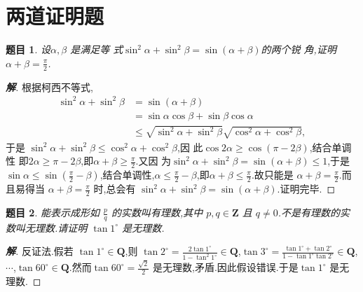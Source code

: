\documentclass[a4paper]{article}
\newtheorem*{hypo}{题目}
\begin{document}
\section{两道证明题}
\begin{hypo}
  设$\alpha,\beta$ 是满足等
  式$\sin^{2}\alpha+\sin^{2}\beta=\sin(\alpha+\beta)$的两个锐
  角,证明 $\alpha+\beta=\frac{\pi}{2}$.
\end{hypo}
\begin{proof}[\textbf{解}]
  根据柯西不等式,
\begin{align*}\sin^{2}\alpha+\sin^{2}\beta&=\sin(\alpha+\beta)\\&=\sin\alpha\cos\beta+\sin\beta\cos\alpha\\&\leq
  \sqrt{\sin^{2}\alpha+\sin^2\beta}\sqrt{\cos^{2}\alpha+\cos^{2}\beta},\end{align*}
于是 $\sin^{2}\alpha+\sin^{2}\beta\leq \cos^{2}\alpha+\cos^{2}\beta$,因
此$\cos2\alpha\geq \cos(\pi -2\beta)$,结合单调性
即$2\alpha\geq\pi-2\beta$,即$\alpha+\beta\geq \frac{\pi}{2}$.又因
为$\sin^{2}\alpha+\sin^{2}\beta=\sin(\alpha+\beta)\leq 1$,于是
$\sin\alpha\leq \sin(\frac{\pi}{2}-\beta)$,结合单调性,$\alpha\leq
\frac{\pi}{2}-\beta$,即$\alpha+\beta\leq \frac{\pi}{2}$.故只能是
$\alpha+\beta=\frac{\pi}{2}$.而且易得当 $\alpha+\beta=\frac{\pi}{2}$
时,总会有 $\sin^{2}\alpha+\sin^{2}\beta=\sin(\alpha+\beta)$.证明完毕.
\end{proof}
\begin{hypo}
  能表示成形如 $\frac{p}{q}$ 的实数叫有理数,其中 $p,q\in
  \mathbf{Z}$ 且 $q\neq 0$.不是有理数的实数叫无理数.请证明 $\tan
  1^{\circ}$ 是无理数.
\end{hypo}
\begin{proof}[\textbf{解}]
  反证法.假若 $\tan 1^{\circ}\in \mathbf{Q}$,则 $\tan
  2^{\circ}=\frac{2\tan 1^{\circ}}{1-\tan^{2} 1^{\circ}}\in
  \mathbf{Q}$,$\tan 3^{\circ}=\frac{\tan 1^{\circ}+\tan
    2^{\circ}}{1-\tan 1^{\circ}\tan 2^{\circ}}\in
  \mathbf{Q}$,$\cdots$,$\tan 60^{\circ}\in \mathbf{Q}$.然而$\tan
  60^{\circ}=\frac{\sqrt{2}}{2}$ 是无理数,矛盾.因此假设错误.于是$\tan
  1^{\circ}$ 是无理数.
\end{proof}
\end{document}

